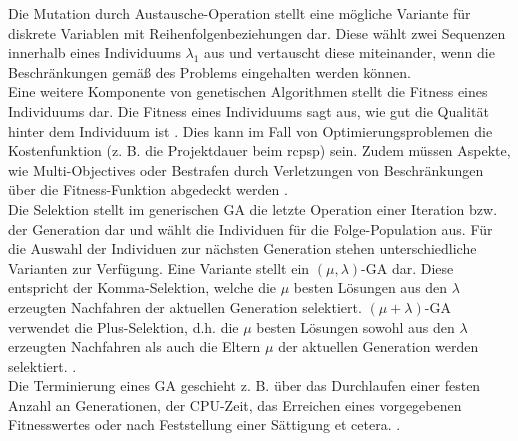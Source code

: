Die Mutation durch Austausche-Operation stellt eine mögliche Variante für diskrete Variablen mit Reihenfolgenbeziehungen dar. Diese wählt zwei Sequenzen innerhalb eines Individuums $\lambda_1$ aus und vertauscht diese miteinander, wenn die Beschränkungen gemäß des Problems eingehalten werden können. \cite[vgl.][S. 154]{siarry_metaheuristics_2016}\\

Eine weitere Komponente von genetischen Algorithmen stellt die Fitness eines Individuums dar. Die Fitness eines Individuums sagt aus, wie gut die Qualität hinter dem Individuum ist \cite[][S. 16 f.]{kramer_genetic_2017}. Dies kann im Fall von Optimierungsproblemen die Kostenfunktion (z. B. die Projektdauer beim \ac{rcpsp}) sein. Zudem müssen Aspekte, wie Multi-Objectives oder Bestrafen durch Verletzungen von Beschränkungen über die Fitness-Funktion abgedeckt werden \cite[vgl.][S. 16 f.]{kramer_genetic_2017}. \\

Die Selektion stellt im generischen \ac{GA} die letzte Operation einer Iteration bzw. der Generation dar und wählt die Individuen für die Folge-Population aus. Für die Auswahl der Individuen zur nächsten Generation stehen unterschiedliche Varianten zur Verfügung. Eine Variante stellt ein $(\mu, \lambda)$-\ac{GA} dar. Diese entspricht der Komma-Selektion, welche die $\mu$ besten Lösungen aus den $\lambda$ erzeugten Nachfahren der aktuellen Generation selektiert. $(\mu+\lambda)$-\ac{GA} verwendet die Plus-Selektion, d.h. die $\mu$ besten Lösungen sowohl aus den $\lambda$ erzeugten Nachfahren als auch die Eltern $\mu$ der aktuellen Generation werden selektiert. \cite[vgl.][S. 16 f.]{kramer_genetic_2017}. \\

Die Terminierung eines \ac{GA} geschieht z. B. über das Durchlaufen einer festen Anzahl an Generationen, der CPU-Zeit, das Erreichen eines vorgegebenen Fitnesswertes oder nach Feststellung einer Sättigung et cetera. \cite[vgl.][S. 17 f.]{kramer_genetic_2017}.